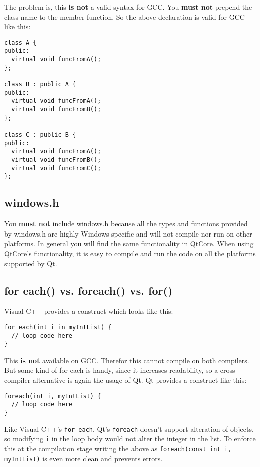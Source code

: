 The problem is, this \textbf{is not} a valid syntax for GCC. You \textbf{must not} prepend the class name to the member function. So the above declaration is valid for GCC like this:

\begin{verbatim}
class A {
public:
  virtual void funcFromA();
};

class B : public A {
public:
  virtual void funcFromA();
  virtual void funcFromB();
};

class C : public B {
public:
  virtual void funcFromA();
  virtual void funcFromB();
  virtual void funcFromC();
};
\end{verbatim}

\subsection{windows.h} You \textbf{must not} include windows.h because all the types and functions provided by windows.h are highly Windows specific and will not compile nor run on other platforms. In general you will find the same functionality in QtCore. When using QtCore's functionality, it is easy to compile and run the code on all the platforms supported by Qt.

\subsection{for each() vs. foreach() vs. for()} Visual C++ provides a construct which looks like this:

\begin{verbatim}
for each(int i in myIntList) {
  // loop code here
}
\end{verbatim}

This \textbf{is not} available on GCC. Therefor this cannot compile on both compilers. But some kind of for-each is handy, since it increases readability, so a cross compiler alternative is again the usage of Qt. Qt provides a construct like this:

\begin{verbatim}
foreach(int i, myIntList) {
  // loop code here
}
\end{verbatim}

Like Visual C++'s \texttt{for each}, Qt's \texttt{foreach} doesn't support alteration of objects, so modifying \texttt{i} in the loop body would not alter the integer in the list.  To enforce this at the compilation stage writing the above as \texttt{foreach(const int i, myIntList)} is even more clean and prevents errors.


